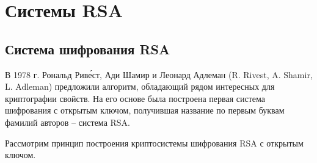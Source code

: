 \section{Системы RSA}

\subsection[Шифрование]{Система шифрования RSA}

В 1978 г. Рональд Рив\'{е}ст, Ади Шамир и Леонард Адлеман  (R. Rivest, A. Shamir, L. Adleman) предложили алгоритм, обладающий рядом интересных для криптографии свойств. На его основе была построена первая система шифрования с открытым ключом, получившая название по первым буквам фамилий авторов -- система RSA.

Рассмотрим принцип построения криптосистемы шифрования RSA с открытым ключом.

